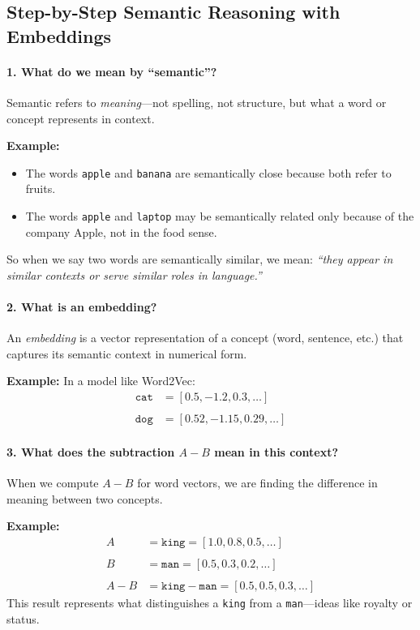 \subsection*{Step-by-Step Semantic Reasoning with Embeddings}

\paragraph{1. What do we mean by \textquotedblleft semantic\textquotedblright?}
Semantic refers to \emph{meaning}—not spelling, not structure, but what a word or concept represents in context.

\textbf{Example:}
\begin{itemize}
	\item The words \texttt{apple} and \texttt{banana} are semantically close because both refer to fruits.
	\item The words \texttt{apple} and \texttt{laptop} may be semantically related only because of the company Apple, not in the food sense.
\end{itemize}
So when we say two words are semantically similar, we mean: \emph{“they appear in similar contexts or serve similar roles in language.”}

\paragraph{2. What is an embedding?}
An \emph{embedding} is a vector representation of a concept (word, sentence, etc.) that captures its semantic context in numerical form.

\textbf{Example:} In a model like Word2Vec:
\begin{align*}
	\texttt{cat} &= [0.5, -1.2, 0.3, \dots] \\\\
	\texttt{dog} &= [0.52, -1.15, 0.29, \dots]
\end{align*}

\paragraph{3. What does the subtraction $A - B$ mean in this context?}
When we compute $A - B$ for word vectors, we are finding the difference in meaning between two concepts.

\textbf{Example:}
\begin{align*}
	A &= \texttt{king} = [1.0, 0.8, 0.5, \dots] \\\\
	B &= \texttt{man} = [0.5, 0.3, 0.2, \dots] \\\\
	A - B &= \texttt{king} - \texttt{man} = [0.5, 0.5, 0.3, \dots]
\end{align*}
This result represents what distinguishes a \texttt{king} from a \texttt{man}—ideas like royalty or status.

